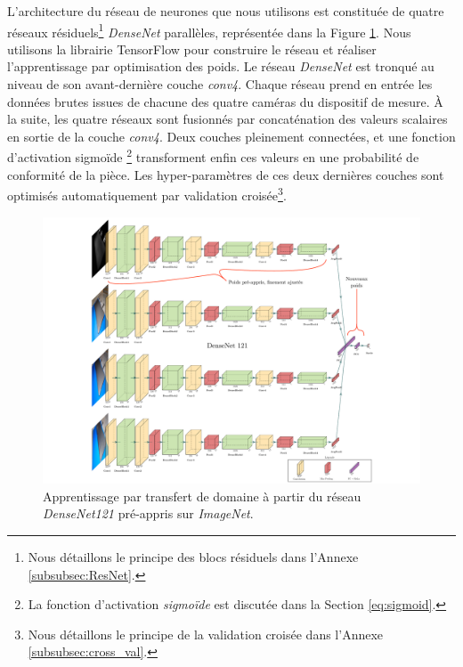 L'architecture du réseau de neurones que nous utilisons est constituée de quatre réseaux résiduels\footnote{Nous détaillons le principe des blocs résiduels dans l'Annexe \ref{subsubsec:ResNet}.} \textit{DenseNet} \cite{huang_densely_2016} parallèles, représentée dans la Figure \ref{fig:transferdensenet121}.
Nous utilisons la librairie TensorFlow \cite{abadi_tensorflow_2016} pour construire le réseau et réaliser l'apprentissage par optimisation des poids.
Le réseau \textit{DenseNet} est tronqué au niveau de son avant-dernière couche \textit{conv4}.
Chaque réseau prend en entrée les données brutes issues de chacune des quatre caméras du dispositif de mesure.
À la suite, les quatre réseaux sont fusionnés par concaténation des valeurs scalaires en sortie de la couche \textit{conv4}.
Deux couches pleinement connectées, et une fonction d'activation sigmoïde \footnote{La fonction d'activation \textit{sigmoïde} est discutée dans la Section \ref{eq:sigmoid}.} transforment enfin ces valeurs en une probabilité de conformité de la pièce.
Les hyper-paramètres de ces deux dernières couches sont optimisés automatiquement par validation croisée\footnote{Nous détaillons le principe de la validation croisée dans l'Annexe \ref{subsubsec:cross_val}.}.


\begin{figure}[hbtp]
	\centering
	\includegraphics[width=\textwidth,height=\textheight,keepaspectratio]{../Chap5/Figures/transfer_densenet121.pdf}
	\caption{Apprentissage par transfert de domaine à partir du réseau \textit{DenseNet121} pré-appris sur \textit{ImageNet}.}
	\label{fig:transferdensenet121}
\end{figure}

